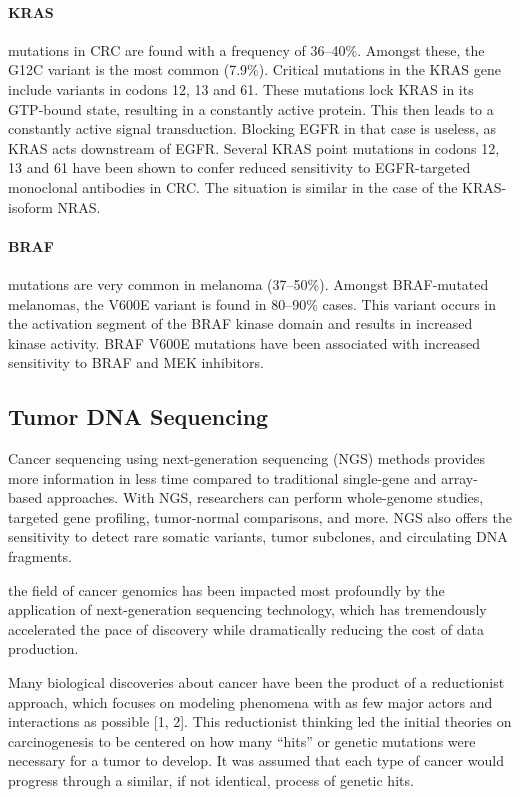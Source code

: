 {{{      \paragraph{KRAS} mutations in CRC are found with a frequency of 36--40\%.
      Amongst these, the G12C variant is the most common (7.9\%). Critical
      mutations in the KRAS gene include variants in codons 12, 13 and 61. These
      mutations lock KRAS in its GTP-bound state, resulting in a constantly
      active protein. This then leads to a constantly active signal
      transduction. Blocking EGFR in that case is useless, as KRAS acts
      downstream of EGFR. Several KRAS point mutations in codons 12, 13 and 61
      have been shown to confer reduced sensitivity to EGFR-targeted monoclonal
      antibodies in CRC. The situation is similar in the case of the
      KRAS-isoform NRAS.

      \paragraph{BRAF} mutations are very common in melanoma (37--50\%). Amongst
      BRAF-mutated melanomas, the V600E variant is found in 80--90\% cases. This
      variant occurs in the activation segment of the BRAF kinase domain and
      results in increased kinase activity. BRAF V600E mutations have been
      associated with increased sensitivity to BRAF and MEK inhibitors.

  \subsection{Tumor DNA Sequencing}

    Cancer sequencing using next-generation sequencing (NGS) methods provides
    more information in less time compared to traditional single-gene and
    array-based approaches. With NGS, researchers can perform whole-genome
    studies, targeted gene profiling, tumor-normal comparisons, and more. NGS
    also offers the sensitivity to detect rare somatic variants, tumor
    subclones, and circulating DNA fragments.

    the field of cancer genomics has been impacted most profoundly by the
    application of next-generation sequencing technology, which has
    tremendously accelerated the pace of discovery while dramatically reducing
    the cost of data production.

    Many biological discoveries about cancer have been the product of a reductionist
    approach, which focuses on modeling phenomena with as few major actors and
    interactions as possible [1, 2]. This reductionist thinking led the initial
    theories on carcinogenesis to be centered on how many “hits” or genetic
    mutations were necessary for a tumor to develop. It was assumed that each type
    of cancer would progress through a similar, if not identical, process of genetic
    hits.

}}}
